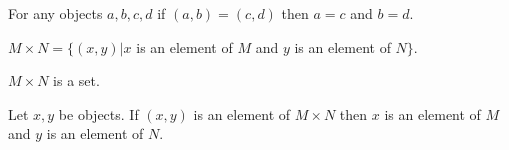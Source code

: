 \documentclass[11pt]{article}
\begin{document}
\begin{forthel}
\begin{axiom}
For any objects $a,b,c,d$ if $(a,b) = (c,d)$ then $a = c$ 
and $b = d$.
\end{axiom}

\begin{definition}
$M \times N = \{(x,y) | x$ is an element of $M$ and $y$ 
is an element of $N\}$.
\end{definition}

\begin{axiom}
$M \times N$ is a set.
\end{axiom}

\begin{lemma}
Let $x,y$ be objects.
If $(x,y)$ is an element of $M \times N$ then $x$ is an 
element of $M$ and $y$ is an element of $N$.
\end{lemma}

\end{forthel}
\end{document}
